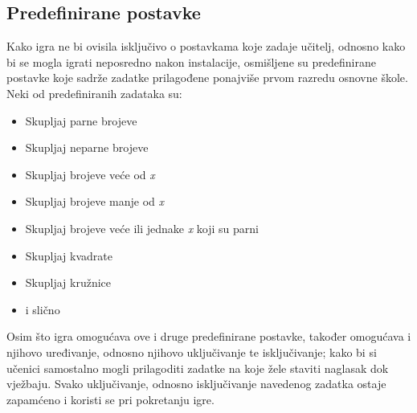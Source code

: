 \documentclass[times, utf8, zavrsni]{fer}
\begin{document}
		\subsection{Predefinirane postavke}
		Kako igra ne bi ovisila isključivo o postavkama koje zadaje učitelj, odnosno kako bi se mogla igrati neposredno nakon instalacije, osmišljene su predefinirane postavke koje sadrže zadatke prilagođene ponajviše prvom razredu osnovne škole.
		Neki od predefiniranih zadataka su: 
			\begin{itemize}
				\item  {Skupljaj parne brojeve}
				\item  {Skupljaj neparne brojeve}
				\item  {Skupljaj brojeve veće od \textit{x}}
				\item  {Skupljaj brojeve manje od \textit{x}}
				\item  {Skupljaj brojeve veće ili jednake \textit{x} koji su parni }
				\item  {Skupljaj kvadrate}
				\item  {Skupljaj kružnice}
				\item {i slično}
			\end{itemize}
		Osim što igra omogućava ove i druge predefinirane postavke, također omogućava i njihovo uređivanje, odnosno njihovo uključivanje te isključivanje; kako bi si učenici samostalno mogli prilagoditi zadatke na koje žele staviti naglasak dok vježbaju.
		Svako uključivanje, odnosno isključivanje navedenog zadatka ostaje zapamćeno i koristi se pri pokretanju igre.
		
\end{document}
